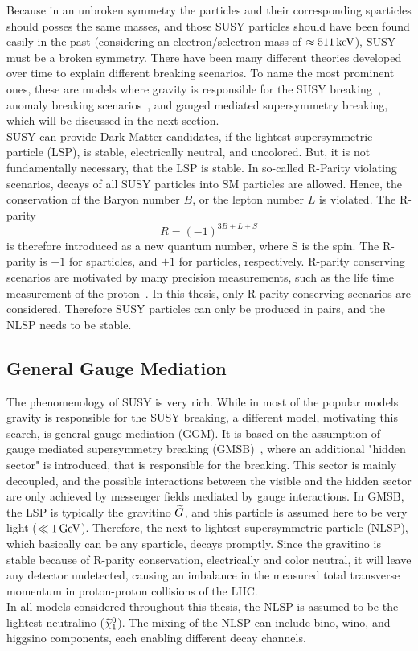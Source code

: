 Because in an unbroken symmetry the particles and their corresponding sparticles should posses the same masses, and those SUSY particles should have been found easily in the past (considering \eg an electron/selectron mass of $\approx511\,\text{ke\hspace{-.08em}V}$), SUSY must be a broken symmetry. There have been many different theories developed over time to explain different breaking scenarios. To name the most prominent ones, these are models where gravity is responsible for the SUSY breaking~\cite{SUSYPrimer}, anomaly breaking scenarios~\cite{AMSB}, and gauged mediated supersymmetry breaking, which will be discussed in the next section.\\
SUSY can provide Dark Matter candidates, if the lightest supersymmetric particle (LSP), is stable, electrically neutral, and uncolored. But, it is not fundamentally necessary, that the LSP is stable. In so-called R-Parity violating scenarios, decays of all SUSY particles into SM particles are allowed. Hence, the conservation of the Baryon number $B$, or the lepton number $L$ is violated. The R-parity
\begin{equation}
 R = (-1)^{3B+L+S}
\end{equation}
is therefore introduced as a new quantum number, where S is the spin. The R-parity is $-1$ for sparticles, and $+1$ for particles, respectively. R-parity conserving scenarios are motivated by many precision measurements, such as the life time measurement of the proton~\cite{ProtonDecay}.
In this thesis, only R-parity conserving scenarios are considered. Therefore SUSY particles can only be produced in pairs, and the NLSP needs to be stable.\\



\subsection{General Gauge Mediation}\label{sec:GGM}
The phenomenology of SUSY is very rich. While in most of the popular models gravity is responsible for the SUSY breaking, a different model, motivating this search, is general gauge mediation (GGM). It is based on the assumption of gauge mediated supersymmetry breaking (GMSB)~\cite{GGM}, where an additional "hidden sector" is introduced, that is responsible for the breaking. This sector is mainly decoupled, and the possible interactions between the visible and the hidden sector are only achieved by messenger fields mediated by gauge interactions. In GMSB, the LSP is typically the gravitino $\widetilde{G}$, and this particle is assumed here to be very light ($\ll1\,\text{Ge\hspace{-.08em}V}$). Therefore, the next-to-lightest supersymmetric particle (NLSP), which basically can be any sparticle, decays promptly. Since the gravitino is stable because of R-parity conservation, electrically and color neutral, it will leave any detector undetected, causing an imbalance in the measured total transverse momentum in proton-proton collisions of the LHC.\\
In all models considered throughout this thesis, the NLSP is assumed to be the lightest neutralino ($\widetilde{\chi}^{0}_{1}$). The mixing of the NLSP can include bino, wino, and higgsino components, each enabling different decay channels.


